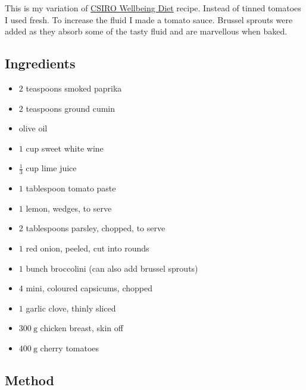 \documentclass[11pt,a4paper]{article}
\begin{document}
This is my variation of
\href{https://www.totalwellbeingdiet.com/au/recipes/quick-easy-recipes/spanish-style-chicken-vegetable-tray-bake/}{CSIRO Wellbeing Diet}
recipe. Instead of tinned tomatoes I used fresh. To increase the fluid I made a tomato sauce. Brussel sprouts were added as they absorb some of the tasty fluid and are marvellous when baked.

\subsection*{Ingredients}

\begin{multicols}{2}

\begin{itemize}
  \item $ 2 $ teaspoons smoked paprika
  \item $ 2 $ teaspoons ground cumin
  \item olive oil
  \item $ 1 $ cup sweet white wine
  \item $ \frac {1}{3} $ cup lime juice
  \item $ 1 $ tablespoon tomato paste
  \item $ 1 $ lemon, wedges, to serve
  \item $ 2 $ tablespoons parsley, chopped, to serve
\end{itemize}

\columnbreak

\begin{itemize}
  \item $ 1 $ red onion, peeled, cut into rounds
  \item $ 1 $ bunch broccolini (can also add brussel sprouts)
  \item $ 4 $ mini, coloured capsicums, chopped
  \item $ 1 $ garlic clove, thinly sliced
  \item $ \qty{300}{\gram} $ chicken breast, skin off
  \item $ \qty{400}{\gram} $ cherry tomatoes
\end{itemize}

\end{multicols}

\medskip

\subsection*{Method}
\end{document}
